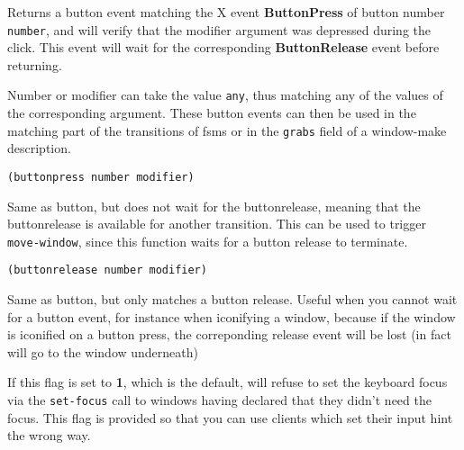 Returns a button event matching the X event {\bf ButtonPress} of button
number \verb"number", and will verify that
the modifier argument was depressed during the click. This event will wait
for the corresponding {\bf ButtonRelease} event before returning.  

Number or modifier can take the value \verb"any", thus matching any of the
values of the corresponding argument.  These button events can then be used
in the matching part of the transitions of fsms or in the \verb"grabs"
field of a window-make description.


        
{\usagefont\begin{verbatim}
(buttonpress number modifier)
\end{verbatim}}\usageupspace

Same as button, but does not wait for the buttonrelease, meaning that the
buttonrelease is available for another transition.
This can be used to trigger \verb"move-window", since this function waits for
a button release to terminate.

        
{\usagefont\begin{verbatim}
(buttonrelease number modifier)
\end{verbatim}}\usageupspace

Same as button, but only matches a button release. Useful when you cannot
wait for a button event, for instance when iconifying a window, because if
the window is iconified on a button press, the correponding release event
will be lost (in fact will go to the window underneath)

        

If this flag is set to {\bf 1}, which is the default, {\GWM} will refuse to
set the keyboard focus via the \verb"set-focus" call to windows having
declared that they didn't need the focus. This flag is provided so that you
can use clients which set their input hint the wrong way.

